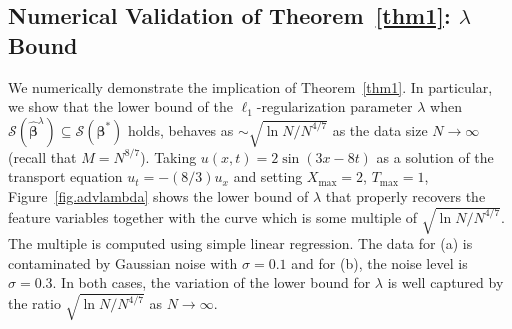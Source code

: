\documentclass[a4paper,11pt]{article}
\newcommand{\bbeta}{\bm{\beta}}
\theoremstyle{definition}
\begin{document}
\subsection{Numerical Validation of Theorem~\ref{thm1}: $\lambda$ Bound}
We numerically demonstrate the implication of Theorem~\ref{thm1}. In particular, we show that the lower bound of the $\ell_1$-regularization parameter $\lambda$ when $\mathcal{S}(\widehat{\bbeta}^\lambda)\subseteq\mathcal{S}(\bbeta^*)$ holds, behaves as $\sim\sqrt{\ln N/N^{4/7}}$ as the data size $N\to \infty$ (recall that $M=N^{8/7}$). Taking $u(x,t)=2\sin(3x-8t)$ as a solution of the transport equation $u_t=-(8/3)u_x$ and setting $X_{\max}=2$, $T_{\max}=1$,  Figure~\ref{fig.advlambda} shows the lower bound of $\lambda$ that properly recovers the feature variables together with the curve which is some multiple of $\sqrt{\ln N/N^{4/7}}$. The multiple is computed using simple linear regression. The data for (a) is contaminated by Gaussian noise with $\sigma=0.1$ and for (b), the noise level is $\sigma=0.3$. In both cases, the variation of the lower bound for $\lambda$ is well captured by the ratio $\sqrt{\ln N/N^{4/7}}$ as $N\to\infty$.  %
\end{document}
